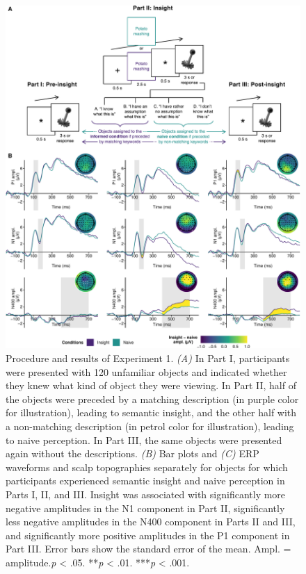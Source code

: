 \documentclass[
  english,
  man,11pt,floatsintext]{apa7}
\begin{document}
\begin{figure}

{\centering \includegraphics{manuscript_files/figure-latex/exp1-plot-1} 

}

\caption{Procedure and results of Experiment 1. \emph{(A)} In Part I, participants were presented with 120 unfamiliar objects and indicated whether they knew what kind of object they were viewing. In Part II, half of the objects were preceded by a matching description (in purple color for illustration), leading to semantic insight, and the other half with a non-matching description (in petrol color for illustration), leading to naive perception. In Part III, the same objects were presented again without the descriptions. \emph{(B)} Bar plots and \emph{(C)} ERP waveforms and scalp topographies separately for objects for which participants experienced semantic insight and naive perception in Parts I, II, and III. Insight was associated with significantly more negative amplitudes in the N1 component in Part II, significantly less negative amplitudes in the N400 component in Parts II and III, and significantly more positive amplitudes in the P1 component in Part III. Error bars show the standard error of the mean. Ampl. = amplitude.\newline*\emph{p} \textless{} .05. **\emph{p} \textless{} .01. ***\emph{p} \textless{} .001.}\label{fig:exp1-plot}
\end{figure}
\end{document}
